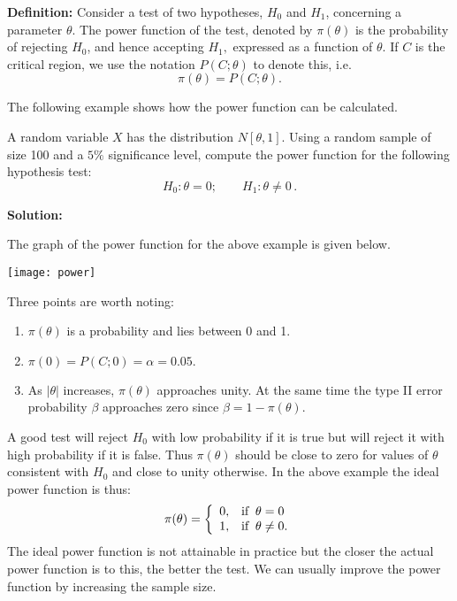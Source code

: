 \documentclass[12pt]{article}
\newenvironment{example}[1][Example:]{\begin{trivlist}
\item[\hskip \labelsep {\bfseries #1}]}{\end{trivlist}}
\begin{document}
\textbf{Definition:} Consider a test of two hypotheses, $H_{0}$ and $H_{1}$, concerning a parameter $\theta.$ The power function of the test, denoted by $\pi(\theta)$ is the probability of rejecting $H_{0}$, and hence accepting $H_{1},$ expressed as a function of $\theta.$ If $C$ is the critical region, we use the notation $P(C;\theta)$ to denote this, i.e. $$\pi(\theta)=P(C;\theta).$$

The following example shows how the power function can be calculated.

\begin{example}
A random variable $X$ has the distribution $N[\theta,1].$ Using a random sample of size 100 and a $5\%$ significance level, compute the power function for the following hypothesis test:
$$
H_{0}: \theta=0; \qquad H_{1}: \theta \neq 0\,.
$$
\end{example}

\begin{mdframed}
\bf{Solution:}
\textcolor[rgb]{1.00,1.00,1.00}{\lipsum[1-6]}
\end{mdframed}

The graph of the power function for the above example is given below.

\begin{center}
  \texttt{[image: power]}
\end{center}

Three points are worth noting:
\begin{enumerate}
\item $\pi(\theta)$ is a probability and lies between 0 and 1.
\item $\pi(0)=P(C;0)=\alpha=0.05.$
\item As $|\theta|$ increases, $\pi(\theta)$ approaches unity. At the same time the type II error probability $\beta$ approaches zero since $\beta=1-\pi(\theta).$
\end{enumerate}

A good test will reject $H_{0}$ with low probability if it is true but will reject it with high probability if it is false. Thus $\pi(\theta)$ should be close to zero for values of $\theta$ consistent with $H_{0}$ and close to unity otherwise. In the above example the ideal power function is thus:
$$\pi(\theta)=\left\{
    \begin{array}{ll}
      0, & \hbox{if}\;\; \theta=0 \\
      1, & \hbox{if}\;\; \theta\neq 0.
    \end{array}
  \right.
$$
The ideal power function is not attainable in practice but the closer the actual power function is to this, the better the test. We can usually improve the power function by increasing the sample size.
\end{document}
